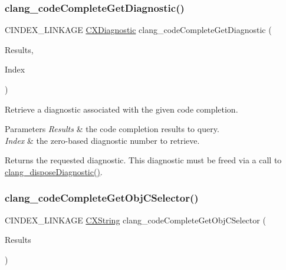 \subsubsection{\texorpdfstring{clang\+\_\+code\+Complete\+Get\+Diagnostic()}{clang\_codeCompleteGetDiagnostic()}}
{\footnotesize\ttfamily C\+I\+N\+D\+E\+X\+\_\+\+L\+I\+N\+K\+A\+GE \hyperlink{group__CINDEX__DIAG_ga44bb8aba7c40590ad25d1763c4fbff7f}{C\+X\+Diagnostic} clang\+\_\+code\+Complete\+Get\+Diagnostic (\begin{DoxyParamCaption}\item[{\hyperlink{structCXCodeCompleteResults}{C\+X\+Code\+Complete\+Results} $\ast$}]{Results,  }\item[{unsigned}]{Index }\end{DoxyParamCaption})}



Retrieve a diagnostic associated with the given code completion. 


\begin{DoxyParams}{Parameters}
{\em Results} & the code completion results to query. \\
\hline
{\em Index} & the zero-\/based diagnostic number to retrieve.\\
\hline
\end{DoxyParams}
\begin{DoxyReturn}{Returns}
the requested diagnostic. This diagnostic must be freed via a call to {\ttfamily \hyperlink{group__CINDEX__DIAG_ga07061e0ad7665b7c5ee7253cd1bf4a5c}{clang\+\_\+dispose\+Diagnostic()}}. 
\end{DoxyReturn}
\mbox{\label{group__CINDEX__CODE__COMPLET_gad03e82d61a1e6cdb78538bf61823aa11}} 
\subsubsection{\texorpdfstring{clang\+\_\+code\+Complete\+Get\+Obj\+C\+Selector()}{clang\_codeCompleteGetObjCSelector()}}
{\footnotesize\ttfamily C\+I\+N\+D\+E\+X\+\_\+\+L\+I\+N\+K\+A\+GE \hyperlink{structCXString}{C\+X\+String} clang\+\_\+code\+Complete\+Get\+Obj\+C\+Selector (\begin{DoxyParamCaption}\item[{\hyperlink{structCXCodeCompleteResults}{C\+X\+Code\+Complete\+Results} $\ast$}]{Results }\end{DoxyParamCaption})}



